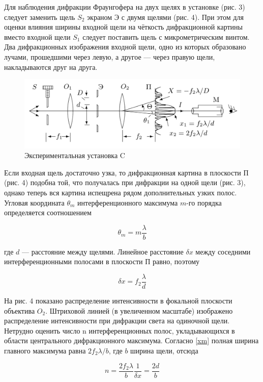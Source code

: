 \documentclass[12pt]{kiarticle}
\begin{document}
Для наблюдения дифракции Фраунгофера на двух щелях в установке (рис. 3) следует заменить щель $ S_2 $ экраном Э с двумя щелями
(рис. 4). При этом для оценки влияния ширины входной щели на чёткость дифракционной картины вместо входной щели $ S_1 $ следует поставить щель с микрометрическим винтом. Два дифракционных изображения входной щели, одно из которых образовано лучами, прошедшими через левую, а другое --- через правую щели, накладываются друг на друга.

	\begin{figure}[h!]
		\centering
		\includegraphics[width=0.8\linewidth]{c.png}
		\caption{Экспериментальная установка C}
		\label{labC}
	\end{figure}

Если входная щель достаточно узка, то дифракционная картина
в плоскости П (рис. 4) подобна той, что получалась при дифракции
на одной щели (рис. 3), однако теперь вся картина испещрена рядом
дополнительных узких полос.
Угловая координата $ \theta_m $ интерференционного максимума $ m $-го порядка определяется соотношением

\begin{equation}\label{}
\theta_m = m \dfrac{\lambda}{b}
\end{equation}

где $ d $ --- расстояние между щелями. Линейное расстояние $ \delta x $ между соседними интерференционными полосами в плоскости П равно, поэтому

\begin{equation}\label{dx}
\delta x = f_2 \dfrac{\lambda}{d}
\end{equation}

На рис. 4 показано распределение интенсивности в фокальной плоскости объектива $ O_2 $. Штриховой линией (в увеличенном масштабе)
изображено распределение интенсивности при дифракции света на одиночной щели. Нетрудно оценить число n интерференционных полос,
укладывающихся в области центрального дифракционного максимума.
Согласно \eqref{xm} полная ширина главного максимума равна $ 2 f_2 \lambda /b $, где $ b $ ширина щели, отсюда

\begin{equation}\label{n}
n = \dfrac{2f_2 \lambda}{b} \dfrac{1}{\delta x} = \dfrac{2d}{b}
\end{equation}
\end{document}
